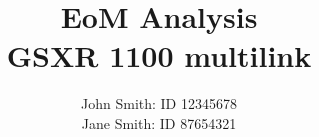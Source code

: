 \title{
EoM Analysis
\\
 GSXR 1100 multilink 
\\
}
\author{
John Smith: ID 12345678
\\
Jane Smith: ID 87654321
\\
}

